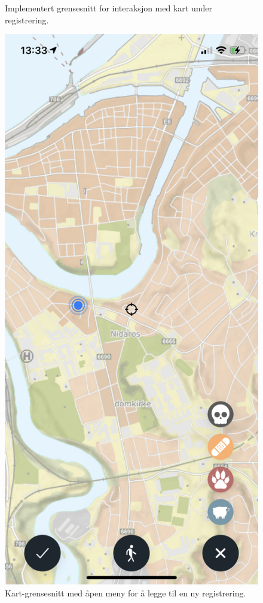 \begin{figure}[H]
\begin{minipage}[b]{0.4\textwidth}
    \caption{Implementert grensesnitt for interaksjon med kart under registrering.}
    \label{fig:kart-plain}
  \end{minipage}
  \hfill
  \begin{minipage}[b]{0.4\textwidth}
    \centering
    \includegraphics[scale=0.4]{Figurer/skjermbilder/kart-meny-apen.png}
    \caption{Kart-grensesnitt med åpen meny for å legge til en ny registrering.}
    \label{fig:kart-meny-apen}
  \end{minipage}
\end{figure}

